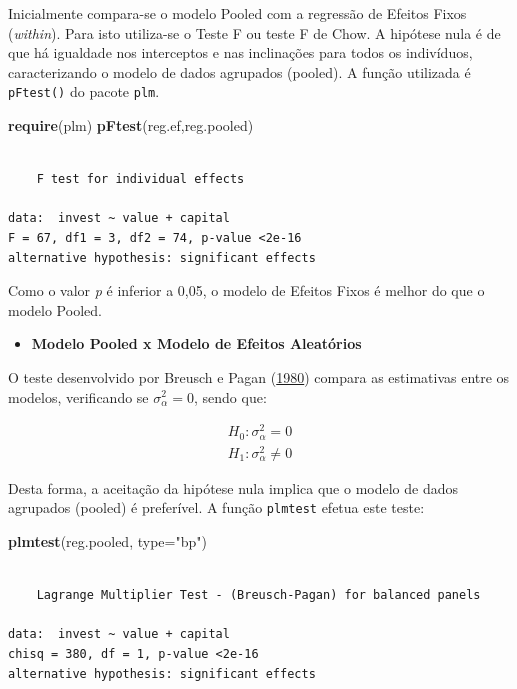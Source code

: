 \documentclass[12pt,brazil,oneside]{book}
\newenvironment{Shaded}{\begin{snugshade}}{\end{snugshade}}
\newcommand{\DataTypeTok}[1]{\textcolor[rgb]{0.13,0.29,0.53}{#1}}
\newcommand{\KeywordTok}[1]{\textcolor[rgb]{0.13,0.29,0.53}{\textbf{#1}}}
\newcommand{\NormalTok}[1]{#1}
\newcommand{\StringTok}[1]{\textcolor[rgb]{0.31,0.60,0.02}{#1}}
\providecommand{\tightlist}{%
  \setlength{\itemsep}{0pt}\setlength{\parskip}{0pt}}
\begin{document}
Inicialmente compara-se o modelo Pooled com a regressão de Efeitos Fixos
(\emph{within}). Para isto utiliza-se o Teste F ou teste F de Chow. A
hipótese nula é de que há igualdade nos interceptos e nas inclinações
para todos os indivíduos, caracterizando o modelo de dados agrupados
(pooled). A função utilizada é \texttt{pFtest()} do pacote \texttt{plm}.

\begin{Shaded}
\begin{Highlighting}[]
\KeywordTok{require}\NormalTok{(plm)}
\KeywordTok{pFtest}\NormalTok{(reg.ef,reg.pooled)}
\end{Highlighting}
\end{Shaded}

\begin{verbatim}

    F test for individual effects

data:  invest ~ value + capital
F = 67, df1 = 3, df2 = 74, p-value <2e-16
alternative hypothesis: significant effects
\end{verbatim}

Como o valor \emph{p} é inferior a 0,05, o modelo de Efeitos Fixos é
melhor do que o modelo Pooled.

\begin{itemize}
\tightlist
\item
  \textbf{Modelo Pooled x Modelo de Efeitos Aleatórios}
\end{itemize}

O teste desenvolvido por Breusch e Pagan
(\protect\hyperlink{ref-breusch1980}{1980}) compara as estimativas entre
os modelos, verificando se \(\sigma^{2}_{\alpha} = 0\), sendo que:

\[
 \begin{matrix}
H_{0}: \sigma^{2}_{\alpha} = 0 \\
H_{1}: \sigma^{2}_{\alpha} \neq 0
 \end{matrix}
\]

Desta forma, a aceitação da hipótese nula implica que o modelo de dados
agrupados (pooled) é preferível. A função \texttt{plmtest} efetua este
teste:

\begin{Shaded}
\begin{Highlighting}[]
\KeywordTok{plmtest}\NormalTok{(reg.pooled, }\DataTypeTok{type=}\StringTok{"bp"}\NormalTok{)}
\end{Highlighting}
\end{Shaded}

\begin{verbatim}

    Lagrange Multiplier Test - (Breusch-Pagan) for balanced panels

data:  invest ~ value + capital
chisq = 380, df = 1, p-value <2e-16
alternative hypothesis: significant effects
\end{verbatim}
\end{document}
